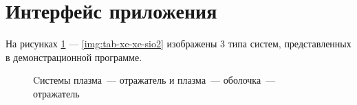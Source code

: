 
\section{Интерфейс приложения}

На рисунках \ref{img:xe-and-xe-sio2} — \ref{img:tab-xe-xe-sio2} изображены 3 типа систем, представленных в демонстрационной программе.

\begin{figure}[H]
	\captionsetup{justification=centering}
	\caption{Cистемы плазма~— отражатель и плазма~— оболочка~— отражатель}
	\label{img:xe-and-xe-sio2}
\end{figure}


